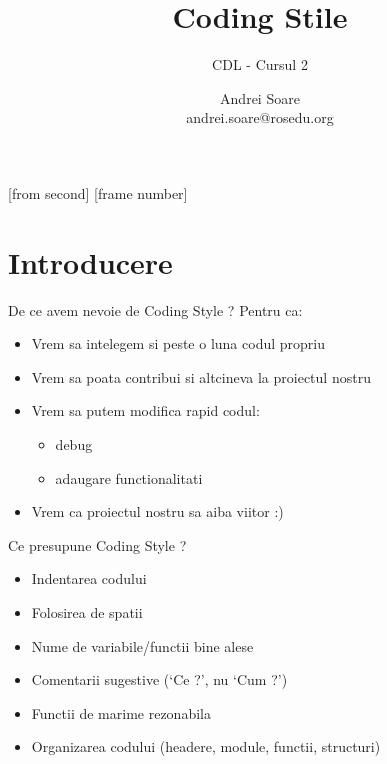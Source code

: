 \documentclass{beamer}
\title[Coding Style]{Coding Stile}
\subtitle{CDL - Cursul 2}
\institute{ROSEdu}
\author{Andrei Soare \\ {\footnotesize andrei.soare@rosedu.org}}
\begin{document}
[from second]
[frame number]

\frame{\titlepage}

\frame{\tableofcontents}


\section{Introducere}

  \frame{\tableofcontents[currentsection]}

  \begin{frame}{De ce avem nevoie de Coding Style ?}
  Pentru ca:\\
  \vspace{0.8cm}
  \begin{itemize}
  \setlength{\itemsep}{0.3cm}
  \pause \item Vrem sa intelegem si peste o luna codul propriu
  \pause \item Vrem sa poata contribui si altcineva la proiectul nostru
  \pause \item Vrem sa putem modifica rapid codul:\begin{itemize} \item debug \item adaugare functionalitati \end{itemize}
  \pause \item Vrem ca proiectul nostru sa aiba viitor :)
  \end{itemize}
  \end{frame}

  \begin{frame}{Ce presupune Coding Style ?}
  \begin{itemize}
  \setlength{\itemsep}{0.3cm}
  \item Indentarea codului \pause
  \item Folosirea de spatii \pause
  \item Nume de variabile/functii bine alese \pause
  \item Comentarii sugestive ({\ttfamily `Ce ?'}, nu {\ttfamily `Cum ?'}) \pause
  \item Functii de marime rezonabila \pause
  \item Organizarea codului (headere, module, functii, structuri)
  \end{itemize}
  \end{frame}
\end{document}
